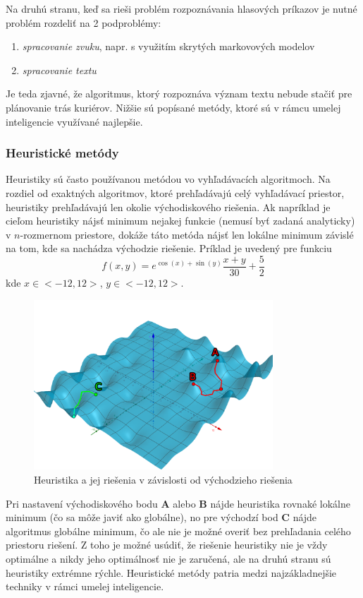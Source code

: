 Na druhú stranu, keď sa rieši problém rozpoznávania hlasových príkazov je nutné problém rozdeliť na 2 podproblémy:
\begin{enumerate}
    \item \emph{spracovanie zvuku}, napr. s využitím skrytých markovových modelov\cite{hmm}
    \item \emph{spracovanie textu}\cite{text_analysis}
\end{enumerate}

Je teda zjavné, že algoritmus, ktorý rozpoznáva význam textu nebude stačiť pre plánovanie trás kuriérov.
Nižšie sú popísané metódy, ktoré sú v rámcu umelej inteligencie využívané najlepšie.

\subsubsection{Heuristické metódy}\cite{heuristic}

Heuristiky sú často používanou metódou vo vyhľadávacích algoritmoch.
Na rozdiel od exaktných algoritmov, ktoré prehľadávajú celý vyhľadávací priestor, heuristiky prehľadávajú len okolie
východiskového riešenia.
Ak napríklad je cieľom heuristiky nájsť minimum nejakej funkcie (nemusí byť zadaná analyticky) v $n$-rozmernom priestore,
dokáže táto metóda nájsť len lokálne minimum závislé na tom, kde sa nachádza východzie riešenie.
Príklad je uvedený pre funkciu
\begin{equation}
    f(x,y)=e^{\cos(x)+\sin(y)}\frac{x+y}{30}+\frac{5}{2}
\end{equation}
kde $x\in<-12,12>$, $y\in<-12,12>$.
\begin{figure}[H]
    \centering
    \includegraphics[width=0.8\textwidth]{images/heuristic.png}
    \caption{Heuristika a jej riešenia v závislosti od východzieho riešenia}
\end{figure}\label{figure:heuristic-method}
Pri nastavení východiskového bodu \textbf{A} alebo \textbf{B} nájde heuristika rovnaké lokálne minimum (čo sa môže javiť
ako globálne), no pre východzí bod \textbf{C} nájde algoritmus globálne minimum, čo ale nie je možné overiť bez
prehľadania celého priestoru riešení.
Z toho je možné usúdiť, že riešenie heuristiky nie je vždy optimálne a nikdy jeho optimálnosť nie je zaručená, ale na
druhú stranu sú heuristiky extrémne rýchle.
Heuristické metódy patria medzi najzákladnejšie techniky v rámci umelej inteligencie.

